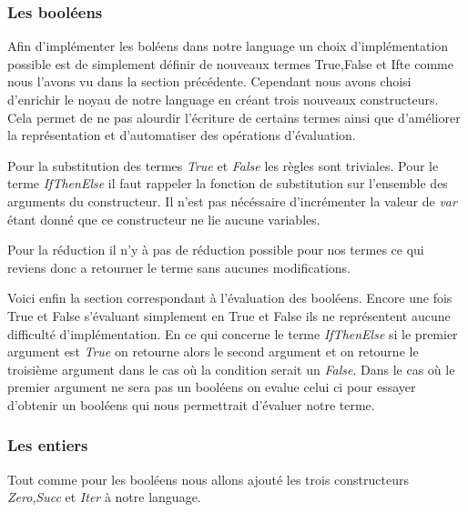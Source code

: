 \documentclass {article}
\newcommand{\codefrom}[3]
           {}
\theoremstyle{definition}
\theoremstyle{remark}
\begin{document}
\subsubsection{Les booléens}

Afin d'implémenter les boléens dans notre language un choix d'implémentation 
possible est de simplement définir de nouveaux termes True,False et Ifte
comme nous l'avons vu dans la section précédente. Cependant nous avons choisi 
d'enrichir le noyau de notre language en créant trois nouveaux constructeurs.
Cela permet de ne pas alourdir l'écriture de certains termes ainsi que 
d'améliorer la représentation et d'automatiser des opérations d'évaluation.

\codefrom{untyped}{lambda}{bool_term}

Pour la substitution des termes \emph{True} et \emph{False} les règles 
sont triviales. Pour le terme \emph{IfThenElse} il faut rappeler la 
fonction de substitution sur l'ensemble des arguments du constructeur.
Il n'est pas nécéssaire d'incrémenter la valeur de \emph{var} étant donné
que ce constructeur ne lie aucune variables.

\codefrom{untyped}{lambda}{bool_substitution}

Pour la réduction il n'y à pas de réduction possible pour nos termes
ce qui reviens donc a retourner le terme sans aucunes modifications.


Voici enfin la section correspondant à l'évaluation des booléens.
Encore une fois True et False s'évaluant simplement en True et False ils
ne représentent aucune difficulté d'implémentation. En ce qui concerne
le terme \emph{IfThenElse} si le premier argument est \emph{True}
on retourne alors le second argument et on retourne le troisième argument 
dans le cas où la condition serait un \emph{False}. Dans le cas 
où le premier argument ne sera pas un booléens on evalue celui ci pour 
essayer d'obtenir un booléens qui nous permettrait d'évaluer notre 
terme.

\codefrom{untyped}{lambda}{bool_evaluation}


\subsubsection{Les entiers}

Tout comme pour les booléens nous allons ajouté les trois constructeurs 
\emph{Zero},\emph{Succ} et \emph{Iter} à notre language.

\codefrom{untyped}{lambda}{nat_term}
\end{document}
